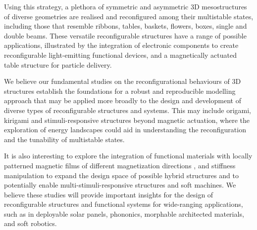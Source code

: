 Using this strategy, a plethora of symmetric and asymmetric 3D mesostructures of diverse geometries are realised and reconfigured among their multistable states, including those that resemble ribbons, tables, baskets, flowers, boxes, single and double beams.
These versatile reconfigurable structures have a range of possible applications, illustrated by the integration of electronic components to create reconfigurable light-emitting functional devices, and a magnetically actuated table structure for particle delivery.

We believe our fundamental studies on the reconfigurational behaviours of 3D structures establish the foundations for a robust and reproducible modelling approach that may be applied more broadly to the design and development of diverse types of reconfigurable structures and systems.
This may include origami, kirigami and stimuli-responsive structures beyond magnetic actuation, where the exploration of energy landscapes could aid in understanding the reconfiguration and the tunability of multistable states.

It is also interesting to explore the integration of functional materials with locally patterned magnetic films of different magnetization directions \cite{Kim2018,Alapan2020}, and stiffness manipulation \cite{Zhai2020} to expand the design space of possible hybrid structures and to potentially enable multi-stimuli-responsive structures and soft machines.
We believe these studies will provide important insights for the design of reconfigurable structures and functional systems for wide-ranging applications, such as in deployable solar panels, phononics, morphable architected materials, and soft robotics.


